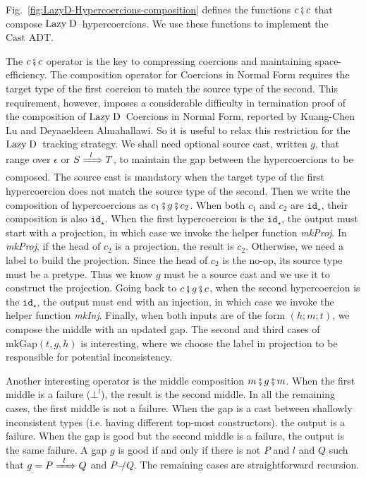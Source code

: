 \documentclass[runningheads]{llncs}
\newcommand{\figref}[1]{Fig.~\ref{#1}}
\newcommand{\LD}{\ensuremath{\text{Lazy\;D}}}
\newcommand{\CastADT}{\ensuremath{\text{Cast ADT}}}
\newcommand{\Tdyn}[0]{\ensuremath{\star}}
\newcommand{\ccast}[3]{#1 \xRightarrow[]{\enskip #2 \enskip} #3}
\newcommand{\cnfid}[1]{\ensuremath{\mathtt{id}_{#1}}}
\newcommand{\hcci}[0]{\cnfid{\Tdyn}}
\newcommand{\hccc}[3]{\ensuremath{(#1;#2;#3)}}
\newcommand{\hcmfail}[1]{\ensuremath{\bot^l}}
\newcommand{\gnone}{\ensuremath{\epsilon}}
\newcommand{\gsome}[3]{\ccast{#1}{#2}{#3}}
\newcommand{\composegap}[3]{\ensuremath{#1 \fatsemi #2 \fatsemi #3}}
\newcommand{\mkgap}[3]{\ensuremath{\mathrm{mkGap}(#1,#2,#3)}}
\newcommand{\compose}[2]{\ensuremath{#1 \fatsemi #2}}
\newcommand{\notshallowlyconsistent}[2]{\ensuremath{#1\not\smile#2}}
\begin{document}
\figref{fig:LazyD-Hypercoercions-composition} defines the functions 
\compose{c}{c} that compose \LD\ hypercoercions. We use these functions to 
implement the \CastADT.


The \compose{c}{c} operator is the key to compressing coercions and maintaining 
space-efficiency. The composition operator for Coercions in Normal Form 
requires the target type of the first coercion to match the source type of the 
second. This requirement, however, imposes a considerable difficulty in 
termination proof of the composition of \LD\ Coercions in Normal Form, reported 
by Kuang-Chen Lu and Deyaaeldeen Almahallawi. So it is useful to relax this 
restriction for the \LD\ tracking strategy.
%
We shall need optional source cast, written $g$, that range over
$\gnone$ or $\gsome{S}{l}{T}$, to maintain the gap between the hypercoercions 
to be composed. The source cast is mandatory when the target
type of the first hypercoercion does not match the source type of the second. 
Then we write the composition of hypercoercions as \composegap{c_1}{g}{c_2}.
%  
When both $c_1$ and $c_2$ are \hcci, their composition is also \hcci. 
%
When the first hypercoercion is the \hcci, the output must start with a 
projection, in which case we invoke the helper function \textit{mkProj}. In 
\textit{mkProj}, if the head of $c_2$ is a projection, the result is $c_2$.  
Otherwise, we need a label to build the projection. Since the head of $c_2$ is 
the no-op, its source type must be a pretype. Thus we know $g$ must be a 
source cast and we use it to construct the projection.
%
Going back to $\composegap{c}{g}{c}$, when the second hypercoercion is the 
\hcci, the output must end with an injection, in which case we invoke the 
helper function \textit{mkInj}.
%
Finally, when both inputs are of the form \hccc{h}{m}{t}, we compose the middle 
with an updated gap.
%
The second and third cases of \mkgap{t}{g}{h} is interesting, where we choose 
the label in projection to be responsible for potential inconsistency.

Another interesting operator is the middle composition \composegap{m}{g}{m}. 
%
When the first middle is a failure (\hcmfail{l}), the result is the second
middle. In all the remaining cases, the first middle is not a failure.
%
When the gap is a cast between shallowly inconsistent types (i.e. having 
different top-most constructors). the output is a failure.
%
When the gap is good but the second middle is a failure, the output is the same 
failure. A gap $g$ is good if and only if there is not $P$ and $l$ 
and $Q$ such that $g = \gsome{P}{l}{Q}$ and \notshallowlyconsistent{P}{Q}.
%
The remaining cases are straightforward recursion.
\end{document}
